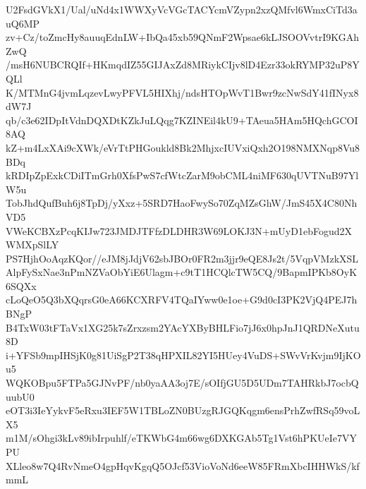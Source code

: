 U2FsdGVkX1/Ual/uNd4x1WWXyVcVGcTACYcmVZypn2xzQMfvl6WmxCiTd3auQ6MP
zv+Cz/toZmcHy8auuqEdnLW+IbQa45xb59QNmF2Wpsae6kLJSOOVvtrI9KGAhZwQ
/msH6NUBCRQIf+HKmqdIZ55GIJAxZd8MRiykCIjv8lD4Ezr33okRYMP32uP8YQLl
K/MTMnG4jvmLqzevLwyPFVL5HIXhj/ndsHTOpWvT1Bwr9zcNwSdY41fINyx8dW7J
qb/c3e62IDpItVdnDQXDtKZkJuLQqg7KZINEil4kU9+TAeua5HAm5HQchGCOI8AQ
kZ+m4LxXAi9cXWk/eVrTtPHGoukld8Bk2MhjxcIUVxiQxh2O198NMXNqp8Vu8BDq
kRDIpZpExkCDiITmGrh0XfsPwS7cfWtcZarM9obCML4niMF630qUVTNuB97YlW5u
TobJhdQufBuh6j8TpDj/yXxz+5SRD7HaoFwySo70ZqMZsGhW/JmS45X4C80NhVD5
VWeKCBXzPcqKIJw723JMDJTFfzDLDHR3W69LOKJ3N+mUyD1ebFogud2XWMXpSlLY
PS7HjhOoAqzKQor//eJM8jJdjV62sbJBOr0FR2m3jjr9eQE8Js2t/5VqpVMzkXSL
AlpFySxNae3nPmNZVaObYiE6Ulagm+c9tT1HCQlcTW5CQ/9BapmIPKb8OyK6SQXx
cLoQeO5Q3bXQqrsG0eA66KCXRFV4TQaIYww0e1oe+G9d0cI3PK2VjQ4PEJ7hBNgP
B4TxW03tFTaVx1XG25k7sZrxzsm2YAcYXByBHLFio7jJ6x0hpJnJ1QRDNeXutu8D
i+YFSb9mpIHSjK0g81UiSgP2T38qHPXIL82YI5HUey4VuDS+SWvVrKvjm9IjKOu5
WQKOBpu5FTPa5GJNvPF/nb0yaAA3oj7E/sOIfjGU5D5UDm7TAHRkbJ7ocbQuubU0
eOT3i3IeYykvF5eRxu3IEF5W1TBLoZN0BUzgRJGQKqgm6ensPrhZwfRSq59voLX5
m1M/sOhgi3kLv89ibIrpuhlf/eTKWbG4m66wg6DXKGAb5Tg1Vst6hPKUeIe7VYPU
XLleo8w7Q4RvNmeO4gpHqvKgqQ5OJcf53VioVoNd6eeW85FRmXbcIHHWkS/kfmmL

